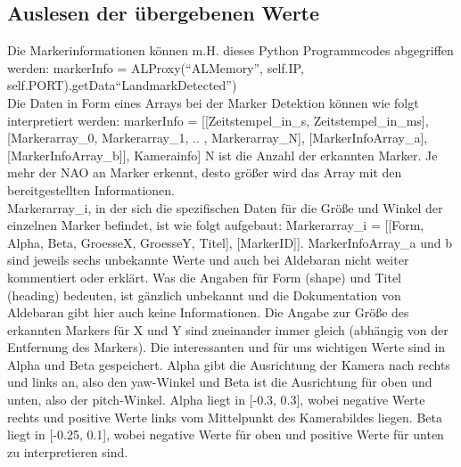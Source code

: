 \subsection{Auslesen der übergebenen Werte}
Die Markerinformationen können m.H. dieses Python Programmcodes abgegriffen werden: 
markerInfo = ALProxy(``ALMemory'', self.IP, self.PORT).getData``LandmarkDetected'')
\\
Die Daten in Form eines Arrays bei der Marker Detektion können wie folgt interpretiert werden: 
markerInfo = [[Zeitstempel\_in\_s, Zeitstempel\_in\_ms], [Markerarray\_0, Markerarray\_1, .. , Markerarray\_N], [MarkerInfoArray\_a], [MarkerInfoArray\_b]], Kamerainfo]
N ist die Anzahl der erkannten Marker. Je mehr der NAO an Marker erkennt, desto größer wird das Array mit den bereitgestellten Informationen. 
\\
Markerarray\_i, in der sich die spezifischen Daten für die Größe und Winkel der einzelnen Marker befindet, ist wie folgt aufgebaut:
Markerarray\_i = [[Form, Alpha, Beta, GroesseX, GroesseY, Titel], [MarkerID]].
MarkerInfoArray\_a und b sind jeweils sechs unbekannte Werte und auch bei Aldebaran nicht weiter kommentiert oder erklärt.
Was die Angaben für Form (shape) und Titel (heading) bedeuten, ist gänzlich unbekannt und die Dokumentation von Aldebaran gibt hier auch keine Informationen. Die Angabe zur Größe des erkannten Markers für X und Y sind zueinander immer gleich (abhängig von der Entfernung des Markers).
Die interessanten und für uns wichtigen Werte sind in Alpha und Beta gespeichert. Alpha gibt die Ausrichtung der Kamera nach rechts und links an, also den yaw-Winkel und Beta ist die Ausrichtung für oben und unten, also der pitch-Winkel. Alpha liegt in [-0.3, 0.3], wobei negative Werte rechts und positive Werte links vom Mittelpunkt des Kamerabildes liegen. Beta liegt  in [-0.25, 0.1], wobei negative Werte für oben und positive Werte für unten zu interpretieren sind.

